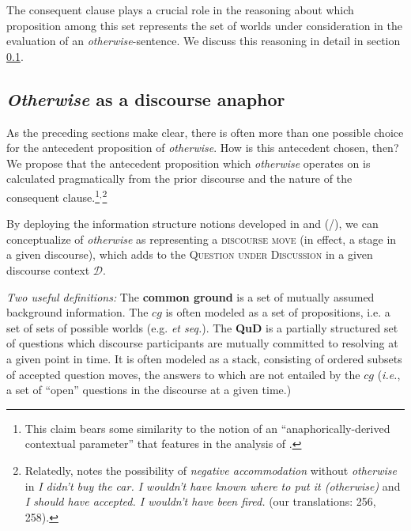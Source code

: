 The consequent clause plays a crucial role in the reasoning about which proposition among this set represents the set of worlds under consideration in the evaluation of an \textit{otherwise}-sentence. We discuss this reasoning in detail in section \ref{sec:qud}. %


\subsection{\emph{Otherwise} as a discourse anaphor}\label{sec:qud}

As the preceding sections make clear, there is often more than one possible choice for the antecedent proposition of \textit{otherwise}. How is this antecedent chosen, then? We propose that the antecedent proposition which \textit{otherwise} operates on is calculated pragmatically from the prior discourse and the nature of the consequent clause.\footnote{This claim bears some similarity to the notion of an ``anaphorically-derived contextual parameter'' that features in the analysis of \citet[14]{Webber2001}.}$ ^, $\footnote{Relatedly, \citet{Corblin2002} notes the possibility of \textit{negative accommodation} without \textit{otherwise} in \textit{I didn't buy the car. I wouldn't have known where to put it (otherwise)} and \textit{I should have accepted. I wouldn't have been fired.} (our translations: 256, 258).}

By deploying the information structure notions developed in \citet{Carlson1983} and \citeauthor{Roberts1996} (\citeyear{Roberts1996}/\citeyear{Roberts2012}), we can conceptualize of \textit{otherwise} as representing a \textsc{discourse move} (in effect, a stage in a given discourse), which adds to the \textsc{Question under Discussion} in a given discourse context $ \mathcal D $.

\pex  \textit{Two useful definitions:}
\a  The \textbf{common ground} is a set of mutually assumed background information. The $cg$ is often modeled as a set of propositions, i.e.  a set of sets of possible worlds (e.g. \citealt{Stalnaker1979} \textit{et seq.}). \label{common-ground}
\a  The \textbf{QuD} is a partially structured set of questions which discourse participants are mutually committed to resolving at a given point in time. It is often modeled as a stack, consisting of ordered subsets of accepted question moves, the answers to which are not entailed by the $cg$ (\textit{i.e.}, a set of ``open'' questions in the discourse at a given time.) \xe

